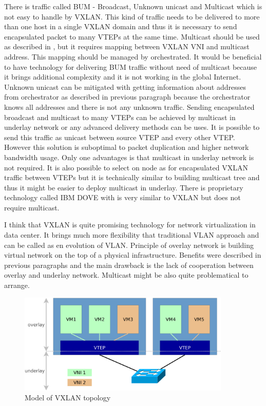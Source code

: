 There is traffic called \Ac{BUM} - Broadcast, Unknown unicast and Multicast which is not easy to handle by \Ac{VXLAN}. This kind of traffic needs to be delivered to more than one host in a single \Ac{VXLAN} domain and thus it is necessary to send encapsulated packet to many \Ac{VTEP}s at the same time. Multicast should be used as described in \cite{rfc7348}, but it requires mapping between \Ac{VXLAN} \Ac{VNI} and multicast address. This mapping should be managed by orchestrated. 
It would be beneficial to have technology for delivering \Ac{BUM} traffic without need of multicast because it brings additional complexity and it is not working in the global Internet. Unknown unicast can be mitigated with getting information about addresses from orchestrator as described in previous paragraph because the orchestrator knows all addresses and there is not any unknown traffic. 
Sending encapsulated broadcast and multicast to many \Ac{VTEP}s can be achieved by multicast in underlay network or any advanced delivery methods can be uses. It is possible to send this traffic as unicast between source \Ac{VTEP} and every other \Ac{VTEP}. However this solution is suboptimal to packet duplication and higher network bandwidth usage. Only one advantages is that multicast in underlay network is not required. It is also possible to select on node as  for encapsulated \Ac{VXLAN} traffic between \Ac{VTEP}s but it is technically similar to building multicast tree and thus it might be easier to deploy multicast in underlay.
There is proprietary technology called IBM DOVE with is very similar to \Ac{VXLAN} but does not require multicast.


I think that \Ac{VXLAN} is quite promising technology for network virtualization in data center. It brings much more flexibility that traditional \Ac{VLAN} approach and can be called as en evolution of \Ac{VLAN}. Principle of overlay network is building virtual network on the top of a physical infrastructure. Benefits were described in previous paragraphs and the main drawback is the lack of cooperation between overlay and underlay network. Multicast might be also quite problematical to arrange.

\begin{figure}[htb]
	\begin{center}
	\includegraphics[width=0.9\textwidth]{vxlan.png}
	\end{center}
	\caption{Model of VXLAN topology}
	\label{img:vxlan-topology}
\end{figure}

